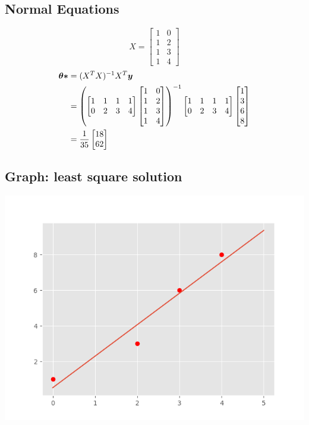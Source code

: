 \documentclass{article}
\begin{document}
    \subsection{Normal Equations}
    \[ X = \begin{bmatrix}
            1 & 0 \\
            1 & 2 \\
            1 & 3 \\
            1 & 4                 
            \end{bmatrix}\]
    \begin{align*}
        \vb*{\theta*} & = (X^T X)^{-1}X^T \vb*{y} \\
        & = \left(\begin{bmatrix}
            1 & 1 & 1 & 1 \\
            0 & 2 & 3 & 4 
            \end{bmatrix}
            \begin{bmatrix}
            1 & 0 \\
            1 & 2 \\
            1 & 3 \\
            1 & 4                 
            \end{bmatrix}\right)^{-1}
           \begin{bmatrix}
            1 & 1 & 1 & 1 \\
            0 & 2 & 3 & 4 
            \end{bmatrix} 
            \begin{bmatrix} 1 \\ 3 \\ 6 \\ 8 \end{bmatrix} \\
        & = \frac{1}{35} \begin{bmatrix} 18 \\ 62 \end{bmatrix}
    \end{align*}

    \subsection{Graph: least square solution}
        \includegraphics{hw1pr2c.png}
\end{document}
